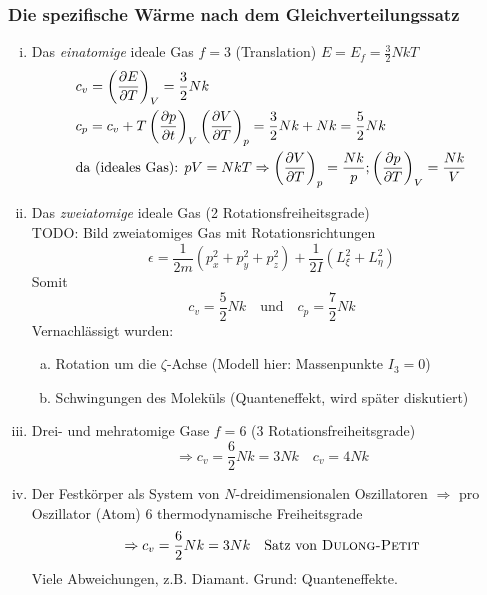 \subsubsection{Die spezifische Wärme nach dem Gleichverteilungssatz}
\begin{enumerate}[i)]
    \item Das \emph{einatomige} ideale Gas $f=3$ (Translation) $E = E_f = \frac{3}{2} N k T$
    \begin{equation}
        \begin{split}
            & c_v = \left( \frac{\partial E}{\partial T} \right)_{V} = \frac{3}{2} N k \\
            & c_p = c_v + T \left( \frac{\partial p}{\partial t} \right)_{V} \left( \frac{\partial V}{\partial T} \right)_{p} = \frac{3}{2} N k + N k = \frac{5}{2} N k \\
            & \text{da (ideales Gas): } pV = N k T \Rightarrow \left( \frac{\partial V}{\partial T} \right)_{p} = \frac{N k }{p}; \left( \frac{\partial p}{\partial T} \right)_{V} = \frac{N k}{V}
        \end{split}
    \end{equation}
    \item Das \emph{zweiatomige} ideale Gas (2 Rotationsfreiheitsgrade) \\
    TODO: Bild zweiatomiges Gas mit Rotationsrichtungen \\ %
    \begin{equation}
        \epsilon = \frac{1}{2 m} \left( p_x^2 + p_y^2 + p_z^2 \right) + \frac{1}{2 I} \left( L_\xi^2 + L_\eta^2 \right)
    \end{equation}
    Somit
    \begin{equation}
        c_v = \frac{5}{2} N k \quad \text{und} \quad c_p = \frac{7}{2} N k
    \end{equation}
    Vernachlässigt wurden:
    \begin{enumerate}[a)]
        \item Rotation um die $\zeta$-Achse (Modell hier: Massenpunkte $I_3 = 0$)
        \item Schwingungen des Moleküls (Quanteneffekt, wird später diskutiert)
    \end{enumerate}
    \item Drei- und mehratomige Gase $f = 6$ (3 Rotationsfreiheitsgrade)
    \begin{equation}
        \Rightarrow c_v = \frac{6}{2} N k = 3 N k \quad c_v = 4 N k
    \end{equation}
    \item Der Festkörper als System von $N$-dreidimensionalen Oszillatoren $\Rightarrow$ pro Oszillator (Atom) 6 thermodynamische Freiheitsgrade
    \begin{equation}
        \Rightarrow c_v = \frac{6}{2} N k = 3 N k \quad \text{Satz von \textsc{Dulong-Petit}}
    \end{equation}
    Viele Abweichungen, z.B. Diamant. Grund: Quanteneffekte.
\end{enumerate}
